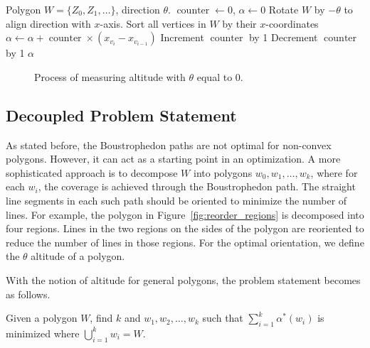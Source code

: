 \documentclass[../main.tex]{subfiles}
\begin{document}
\begin{algorithm}
	\caption{$\operatorname{get\_general\_altitude}(W, \theta)$}
	\label{alg:altitude}
	\begin{algorithmic}[1]
		\REQUIRE Polygon $W=\{Z_0, Z_1,\ldots\}$, direction $\theta$.
			\STATE $\operatorname{counter}\gets 0$, $\alpha\gets 0$
			\STATE Rotate $W$ by $-\theta$ to align direction with $x$-axis.
			\STATE Sort all vertices in $W$ by their  $x$-coordinates
				\STATE $\alpha\gets \alpha+\operatorname{counter}\times(x_{v_{i}}-x_{v_{i-1}})$ 
					\STATE Increment $\operatorname{counter}$ by 1
					\STATE Decrement $\operatorname{counter}$ by 1
				\ENDIF
			\ENDFOR
			\RETURN $\alpha$
	\end{algorithmic}
\end{algorithm}

\begin{figure}
	\centering
	
	\caption{Process of measuring altitude with $\theta$ equal to 0.}
	\label{fig:altitude}
\end{figure}


\subsection{Decoupled Problem Statement}
\label{subsection:decoupled_problem_statement}

As stated before, the Boustrophedon paths are not optimal for non-convex polygons. However, it can act as a starting point in an optimization. A more sophisticated approach is to decompose $W$ into polygons $w_0,w_1,\ldots,w_k$, where for each $w_i$, the coverage is achieved through the Boustrophedon path. The straight line segments in each such path should be oriented to minimize the number of lines. For example, the polygon in Figure~\ref{fig:reorder_regions} is decomposed into four regions. Lines in the two regions on the sides of the polygon are reoriented to reduce the number of lines in those regions. For the optimal orientation, we define the $\theta$ altitude of a polygon.

With the notion of altitude for general polygons, the problem statement becomes as follows.
\begin{problem}
\label{prob:min_alt_decomp}
Given a polygon $W$, find $k$ and $w_1,w_2,\ldots,w_k$ such that $\sum^k_{i=1}\alpha^*(w_i)$ is minimized where $\bigcup^k_{i=1}w_i=W$.
\end{problem}
\end{document}
